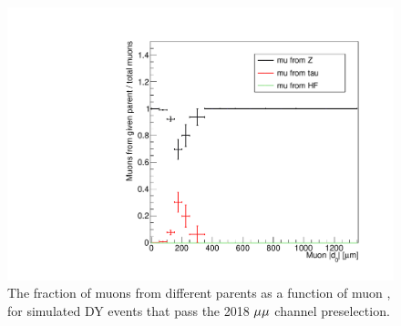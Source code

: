 \begin{figure}[hbtp]
\centering
\includegraphics[scale=0.35]{figures/bg/mumu_DY_muonAbsD0_1000um_variableBins_coarse_ratios.pdf}
\caption{The fraction of muons from different parents as a function of muon \ad, for simulated DY events that pass the 2018 ${\mu}{\mu}$ channel preselection.}
\label{dy_d0_behavior}
\end{figure}
